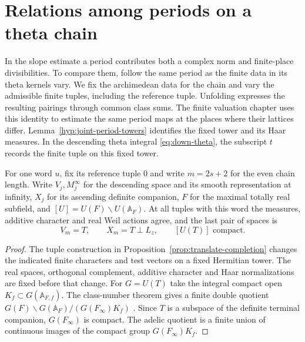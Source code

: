 \section{Relations among periods on a theta chain}\label{sec:transport}

In the slope estimate a period contributes both a complex norm and finite-place divisibilities. To compare them, follow the same period as the finite data in its theta kernels vary. We fix the archimedean data for the chain and vary the admissible finite
tuples, including the reference tuple. Unfolding expresses the
resulting pairings through common class sums. The finite
valuation chapter uses this identity to estimate the same
period maps at the places where their lattices differ.
Lemma~\ref{hyp:joint-period-towers} identifies the fixed tower and its
Haar measures. In the descending theta integral \eqref{eq:down-theta},
the subscript \(t\) records the finite tuple on this fixed tower.

\begin{established}\label{hyp:joint-period-towers}
For one word \(u\), fix its reference tuple \(0\) and write \(m=2s+2\)
for the even chain length. Write \(V_j,M_j^\infty\) for the descending
space and its smooth representation at infinity, \(X_j\) for its
ascending definite companion, \(F\) for the maximal totally real
subfield, and \([U]=U(F)\backslash U(\mathbb A_F)\). At all tuples
with this word the measures, additive character and real Weil actions agree,
and the last pair of spaces is
\[
 V_m=T,\qquad X_m=T\perp L_z,\qquad [U(T)]\text{ compact}.
\]
\end{established}
\begin{proof}
The tuple construction in Proposition~\ref{prop:translate-completion}
changes the indicated finite characters and test vectors on a fixed
Hermitian tower. The real spaces, orthogonal complement, additive character
and Haar normalizations are fixed before that change.
For \(G=U(T)\) take the integral compact open \(K_f\subset G(\mathbb A_{F,f})\).
The class-number theorem gives a finite double quotient
\(G(F)\backslash G(\mathbb A_F)/(G(F_\infty)K_f)\)
\cite[Theorem~5.1]{platonov-rapinchuk-class}. Since \(T\) is a subspace
of the definite terminal companion, \(G(F_\infty)\) is compact.
The adelic quotient is a finite union of continuous images of
the compact group \(G(F_\infty)K_f\).
\end{proof}

